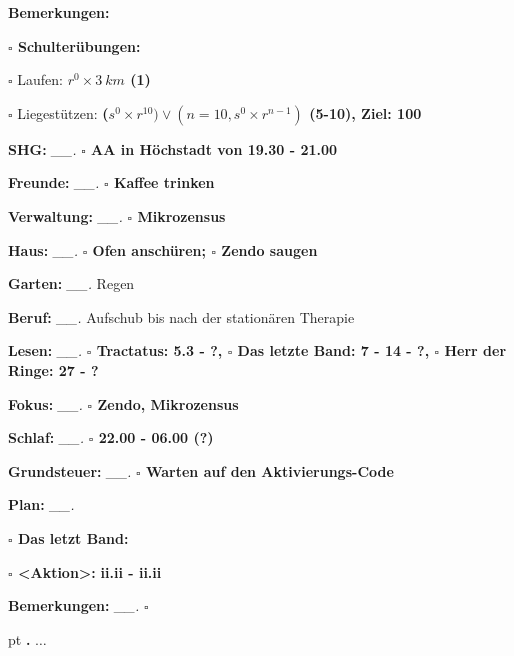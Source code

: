 \documentclass[10pt,a4paper]{article}
\newcounter{notec}
\newcommand\notep[1]{%
  \stepcounter{notec}
  \vskip #1pt
  {\bf\arabic{notec}.}
}
\newcommand\prop[1] {{\color {alizarin} {\bf #1}}}        %
\newcommand\opti[1] {{\color {amethyst} {\bf #1}}}        %
\newcommand\mand[1] {{\color {burntorange} {\bf #1}}}     %
\newcommand\topspace{\vskip -15pt \hskip 20pt}
\newcommand\bottomspace{\vskip 4pt}
\newcommand\n[1] { {\sl #1.} \hskip 5pt }
\begin{document}
\begin{mdframed}[style=daystyle]
\begin{labeling}{{\mand {Bemerkungen:}}}
\begin{minipage}{0.75\textwidth}
\begin{labeling}{\prop {$\square$ {Schulterübungen:}}}
      \item[$\square$ Laufen:]          {\prop {$r^0 \times 3\ km$ (1)}}
      \item[$\square$ Liegestützen:]    {\prop {($s^0 \times r^{10}) \vee (n=10, s^0 \times r^{n-1})$ (5-10), Ziel: 100}}
      \end{labeling}
    \end{minipage}
    \bottomspace        
  \item[{\mand {SHG:}}]          \n{\_\_} {\prop {$\square$ AA in Höchstadt von 19.30 - 21.00}}
  \item[{\mand {Freunde:}}]      \n{\_\_} {\prop {$\square$ Kaffee trinken}}
  \item[{\mand {Verwaltung:}}]   \n{\_\_} {\prop {$\square$ Mikrozensus}}
  \item[{\mand {Haus:}}]         \n{\_\_} {\prop {$\square$ Ofen anschüren; $\square$ Zendo saugen}}
  \item[{\mand {Garten:}}]       \n{\_\_} Regen
  \item[{\mand {Beruf:}}]        \n{\_\_} Aufschub bis nach der stationären Therapie
  \item[{\mand {Lesen:}}]        \n{\_\_} {\prop {$\square$ Tractatus: 5.3 - ?,
      $\square$ Das letzte Band: 7 - 14 - ?, $\square$ Herr der Ringe: 27 - ?}}
  \item[{\mand {Fokus:}}]        \n{\_\_} {\prop {$\square$ Zendo, Mikrozensus}}
  \item[{\mand {Schlaf:}}]       \n{\_\_} {\prop {$\square$ 22.00 - 06.00 (?)}}
  \item[{\opti {Grundsteuer:}}]  \n{\_\_} {\prop {$\square$ Warten auf den Aktivierungs-Code}}
  \item[{\mand {Plan:}}]         \n{\_\_}
    \topspace
    \begin{minipage}{0.75\textwidth}  
      \begin{labeling}{\prop {$\square$ {Das letzt Band:}}} 
        \setlength\itemsep{-3pt}
      \item[{\prop {$\square$ <Aktion>:}}]  {\prop {ii.ii - ii.ii}}
      \end{labeling}
    \end{minipage}
    \bottomspace
  \item[{\mand {Bemerkungen:}}]  \n{\_\_} {\prop {$\square$}}
  \end{labeling}
    
  \setcounter{notec}{0}
  
  \notep 0 $\ldots$
\end{mdframed}
\end{document}
